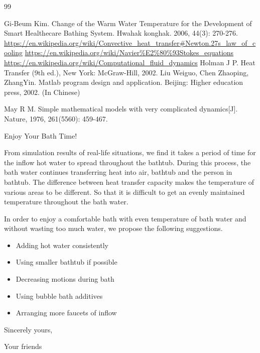 \documentclass{mcmthesis}
\begin{document}
\begin{thebibliography}{99}

 Gi-Beum Kim. Change of the Warm Water Temperature for the Development of Smart Healthecare Bathing System. Hwahak konghak. 2006, 44(3): 270-276.
 \url{https://en.wikipedia.org/wiki/Convective_heat_transfer#Newton.27s_law_of_cooling}
 \url{https://en.wikipedia.org/wiki/Navier\%E2\%80\%93Stokes_equations}
 \url{https://en.wikipedia.org/wiki/Computational_fluid_dynamics}
 Holman J P. Heat Transfer (9th ed.), New York: McGraw-Hill, 2002. 
 Liu Weiguo, Chen Zhaoping, ZhangYin. Matlab program design and application. Beijing: Higher education press, 2002. (In Chinese)

 May R M. Simple mathematical models with very complicated dynamics[J]. Nature, 1976, 261(5560): 459-467.


\end{thebibliography}



\newpage

\begin{letter}{Enjoy Your Bath Time!}

From simulation results of real-life situations, we find it takes a period of time for the inflow hot water to spread throughout the bathtub. During this process, the bath water continues transferring heat into air, bathtub and the person in bathtub. The difference between heat transfer capacity makes the temperature of various areas to be different. So that it is difficult to get an evenly maintained temperature throughout the bath water.

In order to enjoy a comfortable bath with even temperature of bath water and without wasting too much water, we propose the following suggestions.

\begin{itemize}
\item Adding hot water consistently
\item Using smaller bathtub if possible
\item Decreasing motions during bath
\item Using bubble bath additives
\item Arranging more faucets of inflow
\end{itemize}

\vspace{\parskip}

Sincerely yours,

Your friends

\end{letter}
\end{document}
